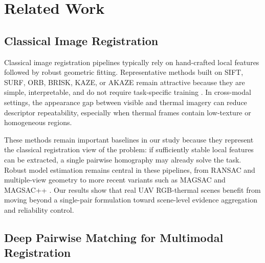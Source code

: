 
\section{Related Work}

\subsection{Classical Image Registration}

Classical image registration pipelines typically rely on hand-crafted local features followed by
robust geometric fitting. Representative methods built on SIFT, SURF, ORB, BRISK, KAZE, or AKAZE
remain attractive because they are simple, interpretable, and do not require task-specific
training
\cite{lowe2004sift,bay2008surf,rublee2011orb,leutenegger2011brisk,alcantarilla2012kaze,alcantarilla2013akaze}.
In cross-modal settings, the appearance gap between visible and thermal imagery can reduce
descriptor repeatability, especially when thermal frames contain low-texture or homogeneous
regions.

These methods remain important baselines in our study because they represent the classical
registration view of the problem: if sufficiently stable local features can be extracted, a single
pairwise homography may already solve the task. Robust model estimation remains central in these
pipelines, from RANSAC and multiple-view geometry to more recent variants such as MAGSAC and
MAGSAC++
\cite{fischler1981ransac,hartley2004multiple,barath2019magsac,barath2020magsacpp}. Our results
show that real UAV RGB-thermal scenes benefit from moving beyond a single-pair formulation toward
scene-level evidence aggregation and reliability control.

\subsection{Deep Pairwise Matching for Multimodal Registration}


